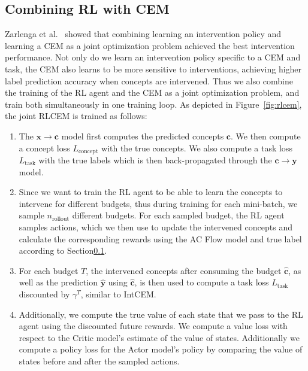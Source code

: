\subsection{Combining RL with CEM}

Zarlenga et al.~\cite{intcem} showed that combining learning an intervention policy
and learning a CEM as a joint optimization problem achieved the best intervention performance.
Not only do we learn an intervention policy specific to a CEM and task, the 
CEM also learns to be more sensitive to interventions, achieving higher label prediction accuracy
when concepts are intervened. Thus we also combine the training of the RL agent and the CEM
as a joint optimization problem, and train
both simultaneously in one training loop.
As depicted in Figure~\ref{fig:rlcem}, the joint RLCEM
is trained as follows:

\begin{enumerate}
    \item The $\mathbf{x} \to \mathbf{c}$ model first computes the predicted concepts $\mathbf{c}$.
    We then compute a concept loss $L_{\text{concept}}$ with the true concepts.
    We also compute a task loss $L_{\text{task}}$ with the true labels
    which is then 
    back-propagated through the $\mathbf{c} \to \mathbf{y}$ model.
    \item Since we want to train the RL agent to be able to learn 
    the concepts to intervene for different budgets, thus during training 
    for each mini-batch, we sample $n_{\text{rollout}}$ different budgets.
    For each sampled budget, the RL agent samples actions, which we then use to 
    update the intervened concepts and calculate the corresponding rewards
    using the AC Flow model and true label according to Section\ref{}.
    \item For each budget $T$, 
    the intervened concepts after consuming the budget $\hat{\mathbf{c}}$,
    as well as the prediction $\hat{\mathbf{y}}$ using $\hat{\mathbf{c}}$,
    is then used to compute a task loss $L_{\text{task}}$ 
    discounted by $\gamma^T$, similar to IntCEM.
    \item Additionally, we compute the true value of each state 
    that we pass to the RL agent using the discounted future rewards.
    We compute a value loss with respect to the
    Critic model's estimate of the value of states.
    Additionally we compute a policy loss for the 
    Actor model's policy by comparing the value of states
    before and after the sampled actions.
\end{enumerate}

